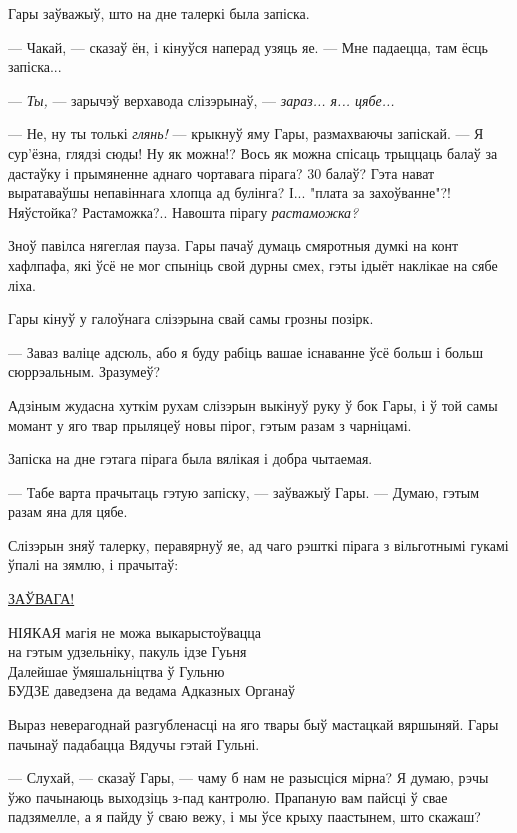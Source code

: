Гары заўважыў, што на дне талеркі была запіска.

--- Чакай, --- сказаў ён, і кінуўся наперад узяць яе. --- Мне падаецца, там 
ёсць запіска...

--- \emph{Ты,} --- зарычэў верхавода слізэрынаў, --- \emph{зараз... я... цябе...}

--- Не, ну ты толькі \emph{глянь!} --- крыкнуў яму Гары, размахваючы запіскай. --- 
Я сур'ёзна, глядзі сюды! Ну як можна!? Вось як можна спісаць трыццаць балаў за 
дастаўку і прымяненне аднаго чортавага пірага? 30 балаў? Гэта нават выратаваўшы 
непавіннага хлопца ад булінга? І... "плата за захоўванне"?! Няўстойка? Растаможка?..
Навошта пірагу \emph{растаможка?} 

Зноў павілса нягеглая пауза. Гары пачаў думаць смяротныя думкі на конт хафлпафа,
які ўсё не мог спыніць свой дурны смех, гэты ідыёт наклікае на сябе ліха.

Гары кінуў у галоўнага слізэрына свай самы грозны позірк. 

--- Заваз валіце адсюль, або я буду рабіць вашае існаванне ўсё больш і больш 
сюррэальным. Зразумеў?

Адзіным жудасна хуткім рухам слізэрын выкінуў руку ў бок Гары, і ў той самы момант 
у яго твар прыляцеў новы пірог, гэтым разам з чарніцамі.

Запіска на дне гэтага пірага была вялікая і добра чытаемая. 

--- Табе варта прачытаць гэтую запіску, --- заўважыў Гары. --- Думаю, гэтым разам 
яна для цябе.

Слізэрын зняў талерку, перавярнуў яе, ад чаго рэшткі пірага з вільготнымі гукамі ўпалі
на зямлю, і прачытаў:

\begin{writtenNoteGame}
\MakeUppercase{\underline{Заўвага!}}

\MakeUppercase{Ніякая} магія не можа выкарыстоўвацца\\
на гэтым удзельніку, пакуль ідзе Гуьня\\
Далейшае ўмяшальніцтва ў Гульню\\
\MakeUppercase{будзе} даведзена да ведама Адказных Органаў
\end{writtenNoteGame}

Выраз неверагоднай разгубленасці на яго твары быў мастацкай вяршыняй. 
Гары пачынаў падабацца Вядучы гэтай Гульні.  

--- Слухай, --- сказаў Гары, --- чаму б нам не разысціся мірна? Я думаю, рэчы
ўжо пачынаюць выходзіць з-пад кантролю. Прапаную вам пайсці ў свае падзямелле, а я
пайду ў сваю вежу, і мы ўсе крыху паастынем, што скажаш?

